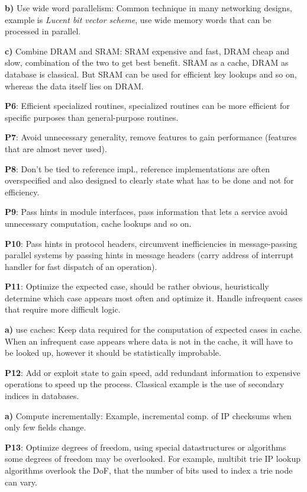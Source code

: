 \textbf{b)} Use wide word parallelism: Common technique in many networking designs, example is \textit{Lucent bit vector scheme}, use wide memory words that can be processed in parallel.

\textbf{c)} Combine DRAM and SRAM: SRAM expensive and fast, DRAM cheap and slow, combination of the two to get best benefit. SRAM as a cache, DRAM as database is classical. But SRAM can be used for efficient key lookups and so on, whereas the data itself lies on DRAM.

\textbf{P6}: Efficient specialized routines, specialized routines can be more efficient for specific purposes than general-purpose routines.

\textbf{P7}: Avoid unnecessary generality, remove features to gain performance (features that are almost never used). 

\textbf{P8}: Don't be tied to reference impl., reference implementations are often overspecified and also designed to clearly state what has to be done and not for efficiency.

\textbf{P9}: Pass hints in module interfaces, pass information that lets a service avoid unnecessary computation, cache lookups and so on.

\textbf{P10}: Pass hints in protocol headers, circumvent inefficiencies in message-passing parallel systems by passing hints in message headers (carry address of interrupt handler for fast dispatch of an operation).

\textbf{P11}: Optimize the expected case, should be rather obvious, heuristically determine which case appears most often and optimize it. Handle infrequent cases that require more difficult logic.

\textbf{a)} use caches: Keep data required for the computation of expected cases in cache. When an infrequent case appears where data is not in the cache, it will have to be looked up, however it should be statistically improbable.

\textbf{P12}: Add or exploit state to gain speed, add redundant information to expensive operations to speed up the process. Classical example is the use of secondary indices in databases.

\textbf{a)} Compute incrementally: Example, incremental comp. of IP checksums when only few fields change.

\textbf{P13}: Optimize degrees of freedom, using special datastructures or algorithms some degrees of freedom may be overlooked. For example, multibit trie IP lookup algorithms overlook the DoF, that the number of bits used to index a trie node can vary.

